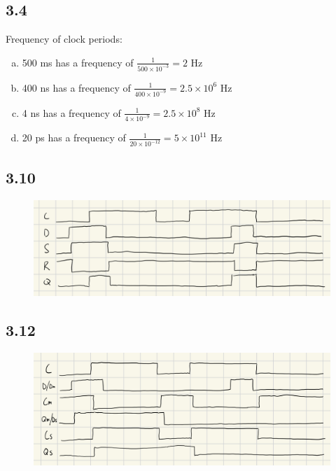 \documentclass{article}
\begin{document}
\subsection*{3.4}
Frequency of clock periods:
\begin{enumerate}[(a)]
    \item 500 ms has a frequency of $\frac{1}{500 \times 10^{-3}} = 2$ Hz
    \item 400 ns has a frequency of $\frac{1}{400 \times 10^{-9}} = 2.5 \times 10^6$ Hz
    \item 4 ns has a frequency of $\frac{1}{4 \times 10^{-9}} = 2.5 \times 10^8$ Hz
    \item 20 ps has a frequency of $\frac{1}{20 \times 10^{-12}} = 5 \times 10^{11}$ Hz
\end{enumerate}

\subsection*{3.10}
\begin{figure}[H]
    \centering
    \includegraphics[width=\textwidth]{./images/3_10.jpg}
\end{figure}

\subsection*{3.12}
\begin{figure}[H]
    \centering
    \includegraphics[width=\textwidth]{./images/3_12.jpg}
\end{figure}
\end{document}
